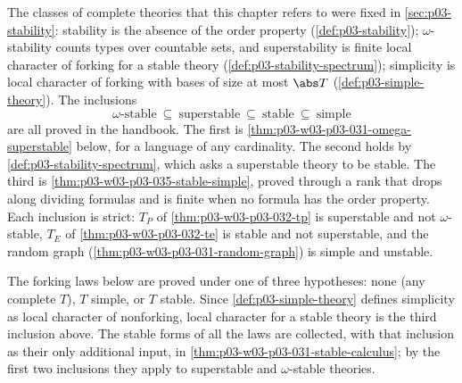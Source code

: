 The classes of complete theories that this chapter refers to were fixed in
\cref{sec:p03-stability}: stability is the absence of the order property
(\cref{def:p03-stability}); \(\omega\)-stability counts types over
countable sets, and superstability is finite local character of forking
for a stable theory (\cref{def:p03-stability-spectrum}); simplicity is
local character of forking with bases of size at most \(\abs T\)
(\cref{def:p03-simple-theory}).  The inclusions
\[
 \omega\text{-stable}\ \subseteq\ \text{superstable}\ \subseteq\
 \text{stable}\ \subseteq\ \text{simple}
\]
are all proved in the handbook.  The first is
\cref{thm:p03-w03-p03-031-omega-superstable} below, for a language of any
cardinality.  The second holds by \cref{def:p03-stability-spectrum}, which
asks a superstable theory to be stable.  The third is
\cref{thm:p03-w03-p03-035-stable-simple}, proved through a rank that drops
along dividing formulas and is finite when no formula has the order
property.  Each inclusion is strict: \(T_P\) of
\cref{thm:p03-w03-p03-032-tp} is superstable and not \(\omega\)-stable,
\(T_E\) of \cref{thm:p03-w03-p03-032-te} is stable and not superstable,
and the random graph (\cref{thm:p03-w03-p03-031-random-graph}) is simple
and unstable.

The forking laws below are proved under one of three hypotheses: none (any
complete \(T\)), \(T\) simple, or \(T\) stable.  Since
\cref{def:p03-simple-theory} defines simplicity as local character of
nonforking, local character for a stable theory is the third inclusion
above.  The stable forms of all the laws are collected, with that
inclusion as their only additional input, in
\cref{thm:p03-w03-p03-031-stable-calculus}; by the first two inclusions
they apply to superstable and \(\omega\)-stable theories.

